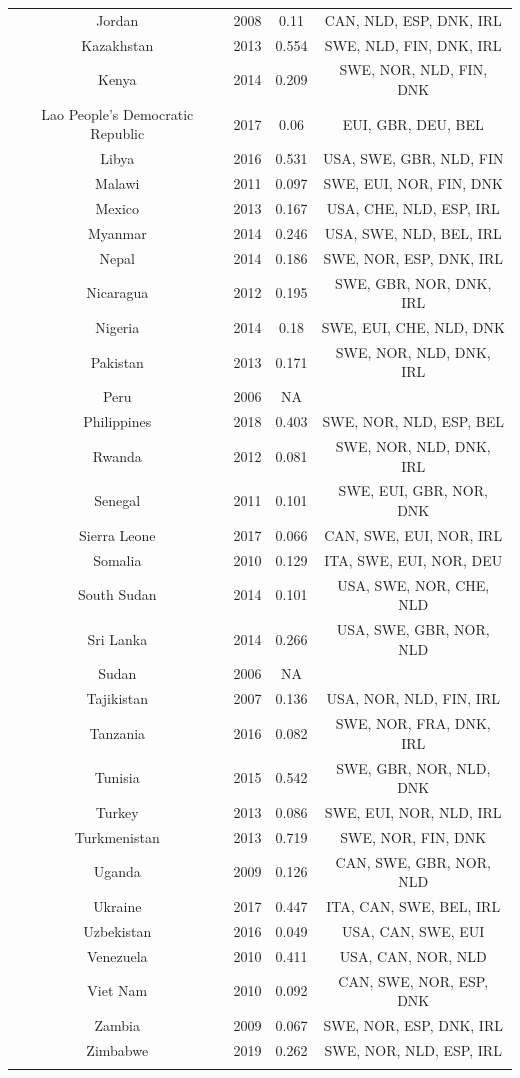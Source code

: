 \begin{table}[!htbp]
\begin{tabular}{@{\extracolsep{3pt}} cccc}
Jordan & 2008 & 0.11 & CAN, NLD, ESP, DNK, IRL \\ 
Kazakhstan & 2013 & 0.554 & SWE, NLD, FIN, DNK, IRL \\ 
Kenya & 2014 & 0.209 & SWE, NOR, NLD, FIN, DNK \\ 
Lao People's Democratic Republic & 2017 & 0.06 & EUI, GBR, DEU, BEL \\ 
Libya & 2016 & 0.531 & USA, SWE, GBR, NLD, FIN \\ 
Malawi & 2011 & 0.097 & SWE, EUI, NOR, FIN, DNK \\ 
Mexico & 2013 & 0.167 & USA, CHE, NLD, ESP, IRL \\ 
Myanmar & 2014 & 0.246 & USA, SWE, NLD, BEL, IRL \\ 
Nepal & 2014 & 0.186 & SWE, NOR, ESP, DNK, IRL \\ 
Nicaragua & 2012 & 0.195 & SWE, GBR, NOR, DNK, IRL \\ 
Nigeria & 2014 & 0.18 & SWE, EUI, CHE, NLD, DNK \\ 
Pakistan & 2013 & 0.171 & SWE, NOR, NLD, DNK, IRL \\ 
Peru & 2006 & NA &  \\ 
Philippines & 2018 & 0.403 & SWE, NOR, NLD, ESP, BEL \\ 
Rwanda & 2012 & 0.081 & SWE, NOR, NLD, DNK, IRL \\ 
Senegal & 2011 & 0.101 & SWE, EUI, GBR, NOR, DNK \\ 
Sierra Leone & 2017 & 0.066 & CAN, SWE, EUI, NOR, IRL \\ 
Somalia & 2010 & 0.129 & ITA, SWE, EUI, NOR, DEU \\ 
South Sudan & 2014 & 0.101 & USA, SWE, NOR, CHE, NLD \\ 
Sri Lanka & 2014 & 0.266 & USA, SWE, GBR, NOR, NLD \\ 
Sudan & 2006 & NA &  \\ 
Tajikistan & 2007 & 0.136 & USA, NOR, NLD, FIN, IRL \\ 
Tanzania & 2016 & 0.082 & SWE, NOR, FRA, DNK, IRL \\ 
Tunisia & 2015 & 0.542 & SWE, GBR, NOR, NLD, DNK \\ 
Turkey & 2013 & 0.086 & SWE, EUI, NOR, NLD, IRL \\ 
Turkmenistan & 2013 & 0.719 & SWE, NOR, FIN, DNK \\ 
Uganda & 2009 & 0.126 & CAN, SWE, GBR, NOR, NLD \\ 
Ukraine & 2017 & 0.447 & ITA, CAN, SWE, BEL, IRL \\ 
Uzbekistan & 2016 & 0.049 & USA, CAN, SWE, EUI \\ 
Venezuela & 2010 & 0.411 & USA, CAN, NOR, NLD \\ 
Viet Nam & 2010 & 0.092 & CAN, SWE, NOR, ESP, DNK \\ 
Zambia & 2009 & 0.067 & SWE, NOR, ESP, DNK, IRL \\ 
Zimbabwe & 2019 & 0.262 & SWE, NOR, NLD, ESP, IRL \\ 
\hline \\[-1.8ex] 
\end{tabular} 
\end{table} 

